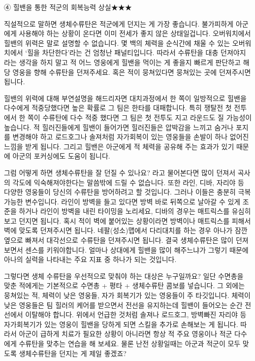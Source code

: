  

④ 힐밴을 통한 적군의 회복능력 상실★★★

직설적으로 말하면 생체수류탄은 적군에게 던지는 게 가장 좋습니다. 불가피하게 아군에게 사용해야 하는 상황이 온다면 이미 전세가 좋지 않은 상태일겁니다. 오버워치에서 힐밴의 위력은 말로 설명할 수 없습니다. 몇 백의 체력을 순식간에 채울 수 있는 오버워치에서 ‘힐을 차단한다’라는 건 엄청난 패널티입니다. 따라서 수류탄을 대충 던져야지라는 생각을 하지 말고 적 어느 영웅에게 힐밴을 먹이는 게 좋을지 빠르게 판단하고 해당 영웅을 향해 수류탄을 던져주세요. 혹은 적이 뭉쳐있다면 뭉쳐있는 곳에 던져주시면 됩니다.

 

힐밴의 위력에 대해 부연설명을 해드리자면 대치과정에서 한 쪽이 일방적으로 힐밴을 다수에게 적중당했다면 높은 확률로 그 팀은 한타를 대패합니다. 특히 쟁탈전 첫 전투에서 한 쪽이 수류탄에 다수 적중 했다면 그 팀은 첫 전투도 지고 라운드도 질 가능성이 높습니다. 적 힐러진들에게 힐밴이 들어가면 힐러진들은 압박감을 느끼고 숨거나 포지를 변경해야 하고 로드호그나 솔져처럼 자가회복이 있는 영웅들을 손발이 하나 없어진 느낌을 받게 됩니다. 그리고 힐밴은 아군에게 적 체력을 공유해 주는 효과가 있기 때문에 아군의 포커싱에도 도움이 됩니다.

 

그럼 어떻게 하면 생체수류탄을 잘 던질 수 있나요? 라고 물어본다면 많이 던져서 곡사의 각도에 익숙해져야한다는 말씀밖에 드릴 수 없습니다. 또한 라인, 디바, 자리야 등 다양한 영웅들이 당신의 수류탄을 방어하려고 할 것입니다. 그러나 이들은 충분히 극복가능한 변수입니다. 라인이 방벽을 들고 있다면 방벽 바로 뒤쪽으로 날아갈 수 있게 조준을 하거나 라인이 방벽을 내린 타이밍을 노리세요, 디바의 경우는 매트릭스를 유심히 보고 던지면 됩니다. 혹시 적이 벽에 붙어있는 상황이라면 방벽이나 매트릭스를 피해서 벽에 맞도록 던져주시면 됩니다. 네팔(성소)맵에서 다리대치를 하는 경우 아나가 잠깐 옆으로 빠져서 대각선으로 수류탄을 던져주시면 됩니다. 결국 생체수류탄은 많이 던져보면서 센스를 키워야합니다. 얼마나 상대에게 힐밴을 많이 해주느냐가 그렇기 때문에 아나의 실력을 나타내는 주요 지표 중 하나가 되는 것입니다.

 

그렇다면 생체 수류탄을 우선적으로 맞춰야 하는 대상은 누구일까요? 일단 수면총을 맞춘 적에게는 기본적으로 수면총 + 평타 + 생체수류탄 콤보를 넣습니다. 그 외에는 뭉쳐있는 적, 체력이 낮은 영웅들, 자가 회복기가 있는 영웅들이 주 타깃입니다. 체력이 낮은 영웅들은 팀 힐러의 케어를 받으면서 전선을 유지하는데 힐밴이 들어오는 순간 전선에서 이탈해야 합니다. 위에서 언급한 것처럼 솔져나 로드호그, 방벽빠진 자리야 등 자가회복기가 있는 영웅이 힐밴을 당하게 되면 스킬을 추가로 손해보는 게 됩니다. 따라서 아군이 급하게 치료가 필요한 상황이 아니라면 항상 적 주요 영웅이나 적군 다수에게 수류탄을 맞추는 연습을 해 보세요. 물론 난전 상황일때는 아군과 적군이 모두 맞도록 생체수류탄을 던지는 게 제일 좋겠죠?

